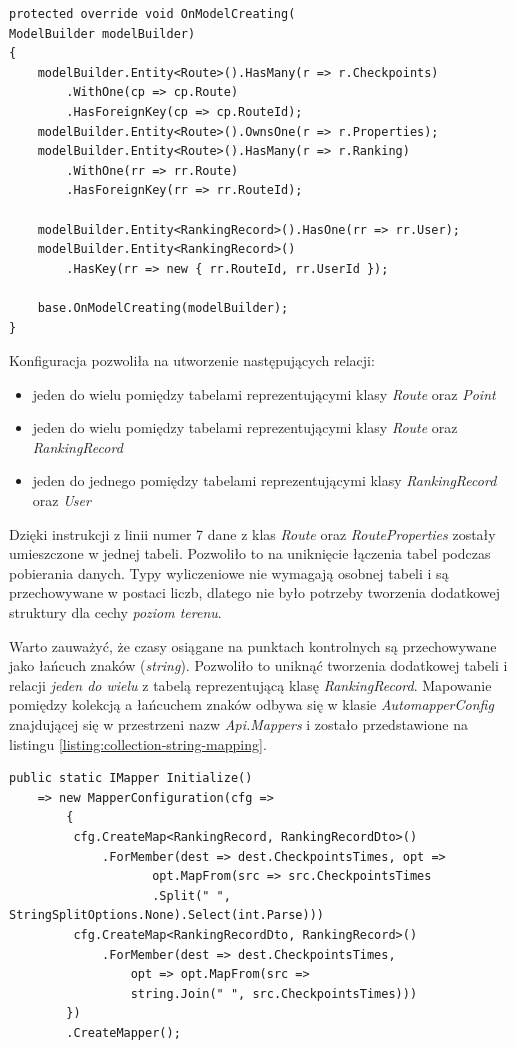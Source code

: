 \begin{lstlisting}[caption={Konfiguracja mapowania relacyjno-obiektowego},label=listing:context]
protected override void OnModelCreating(
ModelBuilder modelBuilder)
{
    modelBuilder.Entity<Route>().HasMany(r => r.Checkpoints)
    	.WithOne(cp => cp.Route)
    	.HasForeignKey(cp => cp.RouteId);
    modelBuilder.Entity<Route>().OwnsOne(r => r.Properties);
    modelBuilder.Entity<Route>().HasMany(r => r.Ranking)
    	.WithOne(rr => rr.Route)
        .HasForeignKey(rr => rr.RouteId);

    modelBuilder.Entity<RankingRecord>().HasOne(rr => rr.User);
    modelBuilder.Entity<RankingRecord>()
    	.HasKey(rr => new { rr.RouteId, rr.UserId });

    base.OnModelCreating(modelBuilder);
}
\end{lstlisting}
Konfiguracja pozwoliła na utworzenie następujących relacji:
\begin{itemize}
\item{jeden do wielu pomiędzy tabelami reprezentującymi klasy \textit{Route}} oraz \textit{Point}
\item{jeden do wielu pomiędzy tabelami reprezentującymi klasy \textit{Route}} oraz \textit{RankingRecord}
\item{jeden do jednego pomiędzy tabelami reprezentującymi klasy \textit{RankingRecord} oraz \textit{User}}
\end{itemize}
Dzięki instrukcji z linii numer 7 dane z klas \textit{Route} oraz \textit{RouteProperties} zostały umieszczone w jednej tabeli. Pozwoliło to na uniknięcie łączenia tabel podczas pobierania danych. Typy wyliczeniowe nie wymagają osobnej tabeli i są przechowywane w postaci liczb, dlatego nie było potrzeby tworzenia dodatkowej struktury dla cechy \textit{poziom terenu}.

Warto zauważyć, że czasy osiągane na punktach kontrolnych są przechowywane jako łańcuch znaków (\textit{string}). Pozwoliło to uniknąć tworzenia dodatkowej tabeli i relacji \textit{jeden do wielu} z tabelą reprezentującą klasę \textit{RankingRecord}. Mapowanie pomiędzy kolekcją a łańcuchem znaków odbywa się w klasie \textit{AutomapperConfig} znajdującej się w przestrzeni nazw \textit{Api.Mappers} i zostało przedstawione na listingu \ref{listing:collection-string-mapping}.
\begin{lstlisting}[caption={Mapowanie pomiedzy kolekcją a łańcuchem znaków},label=collection-string-mapping]
public static IMapper Initialize()
    => new MapperConfiguration(cfg =>
        {
         cfg.CreateMap<RankingRecord, RankingRecordDto>()
             .ForMember(dest => dest.CheckpointsTimes, opt =>
                    opt.MapFrom(src => src.CheckpointsTimes
                    .Split(" ", StringSplitOptions.None).Select(int.Parse)))
         cfg.CreateMap<RankingRecordDto, RankingRecord>()
             .ForMember(dest => dest.CheckpointsTimes,
                 opt => opt.MapFrom(src => 
                 string.Join(" ", src.CheckpointsTimes)))
        })
        .CreateMapper();
\end{lstlisting}

